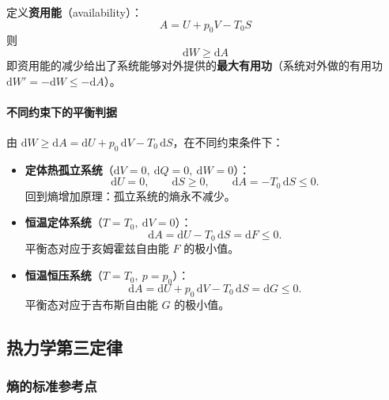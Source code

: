 \documentclass[UTF8]{ctexart}
\theoremstyle{definition}
\begin{document}
定义\textbf{资用能}（availability）：
\begin{equation}
\boxed{A = U + p_0V - T_0S}
\end{equation}
则
\begin{equation}
\boxed{\mathrm{d}W \ge \mathrm{d}A}
\end{equation}
即资用能的减少给出了系统能够对外提供的\textbf{最大有用功}（系统对外做的有用功 $\mathrm{d}W'=-\mathrm{d}W \le -\mathrm{d}A$）。

\paragraph{不同约束下的平衡判据}

由 $\mathrm{d}W \ge \mathrm{d}A = \mathrm{d}U + p_0\,\mathrm{d}V - T_0\,\mathrm{d}S$，在不同约束条件下：

\begin{itemize}
\item \textbf{定体热孤立系统}（$\mathrm{d}V=0,\ \mathrm{d}Q=0,\ \mathrm{d}W=0$）：
\begin{equation}
\mathrm{d}U=0,\qquad \mathrm{d}S \ge 0,\qquad \mathrm{d}A = -T_0\,\mathrm{d}S \le 0.
\end{equation}
回到熵增加原理：孤立系统的熵永不减少。

\item \textbf{恒温定体系统}（$T=T_0,\ \mathrm{d}V=0$）：
\begin{equation}
\mathrm{d}A = \mathrm{d}U - T_0\,\mathrm{d}S = \mathrm{d}F \le 0.
\end{equation}
平衡态对应于亥姆霍兹自由能 $F$ 的极小值。

\item \textbf{恒温恒压系统}（$T=T_0,\ p=p_0$）：
\begin{equation}
\mathrm{d}A = \mathrm{d}U + p_0\,\mathrm{d}V - T_0\,\mathrm{d}S = \mathrm{d}G \le 0.
\end{equation}
平衡态对应于吉布斯自由能 $G$ 的极小值。
\end{itemize}


\newpage
\subsection{热力学第三定律}

\subsubsection*{熵的标准参考点}
\end{document}
